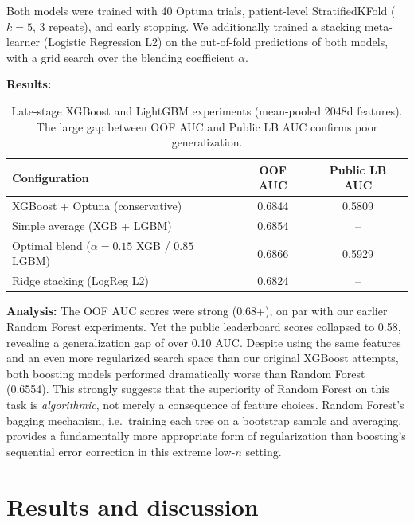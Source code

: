 \documentclass[11pt,a4paper]{article}
\begin{document}
Both models were trained with 40 Optuna trials, patient-level StratifiedKFold ($k=5$, 3 repeats), and early stopping. We additionally trained a stacking meta-learner (Logistic Regression L2) on the out-of-fold predictions of both models, with a grid search over the blending coefficient $\alpha$.

\textbf{Results:}

\begin{table}[H]
    \centering
    \caption{Late-stage XGBoost and LightGBM experiments (mean-pooled 2048d features). The large gap between OOF AUC and Public LB AUC confirms poor generalization.}
    \begin{tabular}{lcc}
        \toprule
        \textbf{Configuration} & \textbf{OOF AUC} & \textbf{Public LB AUC} \\
        \midrule
        XGBoost + Optuna (conservative)            & 0.6844 & 0.5809 \\
        Simple average (XGB + LGBM)                & 0.6854 & -- \\
        Optimal blend ($\alpha=0.15$ XGB / $0.85$ LGBM) & 0.6866 & 0.5929 \\
        Ridge stacking (LogReg L2)                 & 0.6824 & -- \\
        \bottomrule
    \end{tabular}
\end{table}

\textbf{Analysis:} The OOF AUC scores were strong (0.68+), on par with our earlier Random Forest experiments. Yet the public leaderboard scores collapsed to 0.58, revealing a generalization gap of over 0.10 AUC. Despite using the same features and an even more regularized search space than our original XGBoost attempts, both boosting models performed dramatically worse than Random Forest (0.6554). This strongly suggests that the superiority of Random Forest on this task is \emph{algorithmic}, not merely a consequence of feature choices. Random Forest's bagging mechanism, i.e.\ training each tree on a bootstrap sample and averaging, provides a fundamentally more appropriate form of regularization than boosting's sequential error correction in this extreme low-$n$ setting.

\newpage
\section{Results and discussion}
\label{sec:results}
\end{document}
